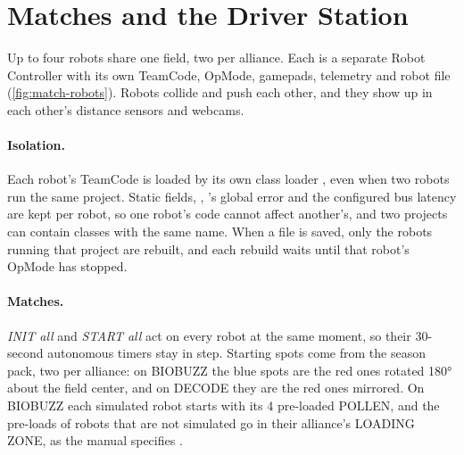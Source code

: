 \documentclass[10pt,twocolumn,letterpaper]{article}
\begin{document}
\section{Matches and the Driver Station}\label{sec:matches}

Up to four robots share one field, two per alliance. Each is a separate Robot Controller with its own TeamCode, OpMode, gamepads, telemetry and robot file (\cref{fig:match-robots}). Robots collide and push each other, and they show up in each other's distance sensors and webcams.

\paragraph{Isolation.} Each robot's TeamCode is loaded by its own class loader \citep{liang1998dynamic}, even when two robots run the same project. Static fields, , 's global error and the configured bus latency are kept per robot, so one robot's code cannot affect another's, and two projects can contain classes with the same name. When a file is saved, only the robots running that project are rebuilt, and each rebuild waits until that robot's OpMode has stopped.

\paragraph{Matches.} \emph{INIT all} and \emph{START all} act on every robot at the same moment, so their 30-second autonomous timers stay in step. Starting spots come from the season pack, two per alliance: on BIOBUZZ the blue spots are the red ones rotated 180° about the field center, and on DECODE they are the red ones mirrored. On BIOBUZZ each simulated robot starts with its 4 pre-loaded POLLEN, and the pre-loads of robots that are not simulated go in their alliance's LOADING ZONE, as the manual specifies \citep{first2026biobuzz}.
\end{document}
